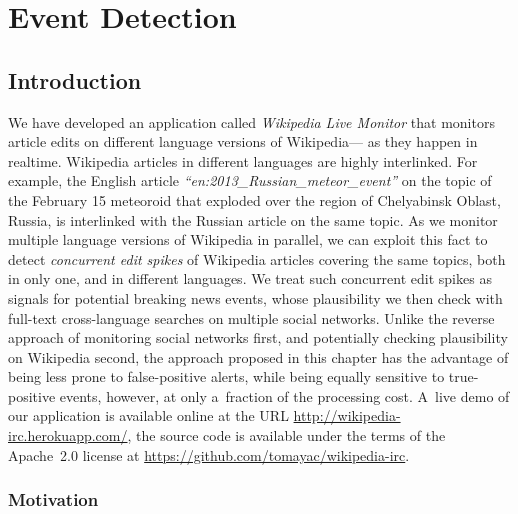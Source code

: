 

\chapter{Event Detection}

\ifpdf
    \graphicspath{{10_event_detection/figures/PNG/}{10_event_detection/figures/PDF/}{10_event_detection/figures/}}
\else
    \graphicspath{{10_event_detection/figures/EPS/}{10_event_detection/figures/}}
\fi

\section{Introduction}

We have developed an application called \emph{Wikipedia Live Monitor}
that monitors article edits on different language versions of Wikipedia---%
as they happen in realtime.
Wikipedia articles in different languages are highly interlinked.
For example, the English article \emph{``en:2013\_Russian\_meteor\_event''}
on the topic of the February 15 meteoroid
that exploded over the region of Chelyabinsk Oblast, Russia,
is interlinked with 
the Russian article on the same topic.
As we monitor multiple language versions of Wikipedia in parallel,
we can exploit this fact to detect \emph{concurrent edit spikes}
of Wikipedia articles covering the same topics,
both in only one, and in different languages.
We treat such concurrent edit spikes as signals
for potential breaking news events, whose plausibility we then check 
with full-text cross-language searches on multiple social networks.
Unlike the reverse approach of monitoring social networks first,
and potentially checking plausibility on Wikipedia second,
the approach proposed in this chapter has the advantage of
being less prone to false-positive alerts, while being equally sensitive
to true-positive events, however, at only a~fraction of the processing cost.
A~live demo of our application is available online
at the URL \url{http://wikipedia-irc.herokuapp.com/},
the source code is available
under the terms of the Apache~2.0 license at 
\url{https://github.com/tomayac/wikipedia-irc}.

\subsection{Motivation}

